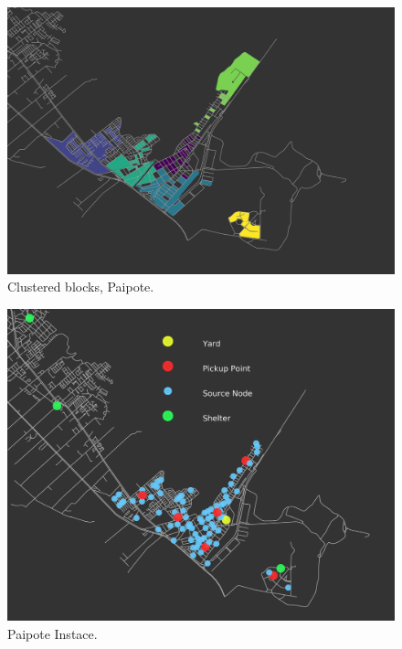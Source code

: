 \documentclass[conference]{IEEEtran}
\begin{document}
\begin{figure}[htbp]
\centerline{\includegraphics{clustered_blocks.png}}
\caption{Clustered blocks, Paipote.}
\label{fig2}
\end{figure}

\begin{figure}[htbp]
\centerline{\includegraphics{paipote_instance.png}}
\caption{Paipote Instace.}
\label{fig3}
\end{figure}
\end{document}
